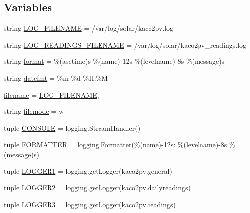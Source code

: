 \subsection*{Variables}
\begin{DoxyCompactItemize}
\item 
string \hyperlink{namespacekaco2pvo_ae7051b1e33f9f50f3ebaa0d7599508b0}{L\+O\+G\+\_\+\+F\+I\+L\+E\+N\+A\+M\+E} = \textquotesingle{}/var/log/solar/kaco2pv.\+log\textquotesingle{}
\item 
string \hyperlink{namespacekaco2pvo_adc1024bae951cf0139b81e6ea62a9416}{L\+O\+G\+\_\+\+R\+E\+A\+D\+I\+N\+G\+S\+\_\+\+F\+I\+L\+E\+N\+A\+M\+E} = \textquotesingle{}/var/log/solar/kaco2pv\+\_\+readings.\+log\textquotesingle{}
\item 
string \hyperlink{namespacekaco2pvo_a8e0cef267ad3a400b70c9411a08cec1a}{format} = \textquotesingle{}\%(asctime)s \%(name)-\/12s \%(levelname)-\/8s \%(message)s\textquotesingle{}
\item 
string \hyperlink{namespacekaco2pvo_ace25c8f7b6c649306e146a503053eab4}{datefmt} = \textquotesingle{}\%m-\/\%d \%H\+:\%M\textquotesingle{}
\item 
\hyperlink{namespacekaco2pvo_abdd68648081e46aedb256202cc9744c1}{filename} = \hyperlink{namespacekaco2pvo_ae7051b1e33f9f50f3ebaa0d7599508b0}{L\+O\+G\+\_\+\+F\+I\+L\+E\+N\+A\+M\+E},
\item 
string \hyperlink{namespacekaco2pvo_ac3aca84da77e325966b4a79a15d4f0bd}{filemode} = \textquotesingle{}w\textquotesingle{}
\item 
tuple \hyperlink{namespacekaco2pvo_adf356df59afe5b3a345850ed820ef806}{C\+O\+N\+S\+O\+L\+E} = logging.\+Stream\+Handler()
\item 
tuple \hyperlink{namespacekaco2pvo_ae338ae856d783c3f2f8636a2c3fb397f}{F\+O\+R\+M\+A\+T\+T\+E\+R} = logging.\+Formatter(\textquotesingle{}\%(name)-\/12s\+: \%(levelname)-\/8s \%(message)s\textquotesingle{})
\item 
tuple \hyperlink{namespacekaco2pvo_acc657a067d1fb3fab2e8a4215bc2fbb0}{L\+O\+G\+G\+E\+R1} = logging.\+get\+Logger(\textquotesingle{}kaco2pv.\+general\textquotesingle{})
\item 
tuple \hyperlink{namespacekaco2pvo_a582f5f9563f2851ddad564ea4dfc173e}{L\+O\+G\+G\+E\+R2} = logging.\+get\+Logger(\textquotesingle{}kaco2pv.\+dailyreadings\textquotesingle{})
\item 
tuple \hyperlink{namespacekaco2pvo_ae935d61a481e99111efe2ed1db9bd027}{L\+O\+G\+G\+E\+R3} = logging.\+get\+Logger(\textquotesingle{}kaco2pv.\+readings\textquotesingle{})

\end{DoxyCompactItemize}
